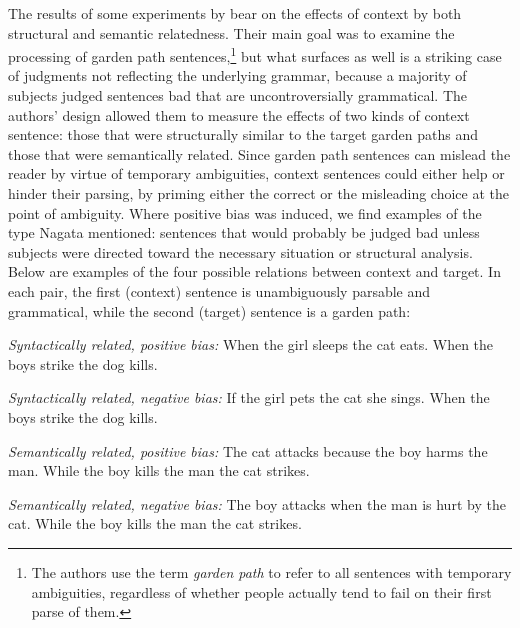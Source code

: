 The results of some experiments by \citet{WarnerEtAl1987} bear on the effects of context by both structural and semantic relatedness. Their main goal was to examine the processing of garden path sentences,\footnote{The authors use the term \textit{garden path} to refer to all sentences with temporary ambiguities, regardless of whether people actually tend to fail on their first parse of them.}
but what surfaces as well is a striking case of judgments not reflecting the underlying grammar, because a majority of subjects judged sentences bad that are uncontroversially grammatical. The authors' design allowed them to measure the  effects  of  two kinds of context sentence: those that were structurally similar to the target garden paths and those that were semantically related. Since garden path sentences can mislead the reader by virtue of temporary ambiguities, context sentences could either help or hinder their parsing, by priming either the correct or the misleading choice at the point of ambiguity. Where positive bias was induced, we find examples of the type Nagata mentioned: sentences that would probably be judged bad unless subjects were directed toward the necessary situation or structural analysis. Below are examples of the four possible relations between context and target. In each pair, the first (context) sentence is unambiguously parsable and grammatical, while the second (target) sentence is a garden path:

\largerpage

\ea\label{ex:5:16} 
\textit{Syntactically related, positive  bias:}
\ea  When the girl sleeps the cat eats.
\ex  When the boys strike the  dog kills.
\z
\z

 
\ea\label{ex:5:17} 
\textit{Syntactically  related, negative bias:}
\ea
If the girl pets the cat she sings.
\ex
When the boys strike the dog kills.
\z
\z

\ea\label{ex:5:18} 
 \textit{Semantically  related, positive  bias:}
\ea
The cat attacks because the boy harms the man.
\ex
While the boy kills the man the cat strikes.
\z
\z

\ea\label{ex:5:19} 
 \textit{Semantically  related, negative bias:}
\ea
The boy attacks when the man is hurt by the cat.
\ex
While the boy kills the man the cat strikes.
\z
\z

